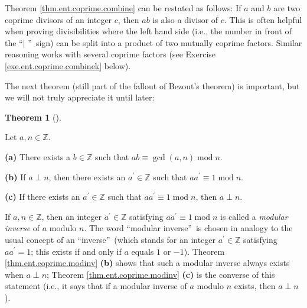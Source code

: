 \documentclass[numbers=enddot,12pt,final,onecolumn,notitlepage]{scrartcl}%
\numberwithin{exer}{subsection}
\theoremstyle{definition}
\newtheorem{theo}{Theorem}[subsection]
\newenvironment{theorem}[1][]
{\begin{theo}[#1]\begin{leftbar}}
{\end{leftbar}\end{theo}}
\begin{document}
Theorem \ref{thm.ent.coprime.combine} can be restated as follows: If $a$ and
$b$ are two coprime divisors of an integer $c$, then $ab$ is also a divisor of
$c$. This is often helpful when proving divisibilities where the left hand
side (i.e., the number in front of the \textquotedblleft$\mid$%
\textquotedblright\ sign) can be split into a product of two mutually coprime
factors. Similar reasoning works with several coprime factors (see Exercise
\ref{exe.ent.coprime.combinek} below).

The next theorem (still part of the fallout of Bezout's theorem) is important,
but we will not truly appreciate it until later:

\begin{theorem}
\label{thm.ent.coprime.modinv}Let $a,n\in\mathbb{Z}$.

\textbf{(a)} There exists a $b\in\mathbb{Z}$ such that $ab\equiv\gcd\left(
a,n\right)  \operatorname{mod}n$.

\textbf{(b)} If $a\perp n$, then there exists an $a^{\prime}\in\mathbb{Z}$
such that $aa^{\prime}\equiv1\operatorname{mod}n$.

\textbf{(c)} If there exists an $a^{\prime}\in\mathbb{Z}$ such that
$aa^{\prime}\equiv1\operatorname{mod}n$, then $a\perp n$.
\end{theorem}

If $a,n\in\mathbb{Z}$, then an integer $a^{\prime}\in\mathbb{Z}$ satisfying
$aa^{\prime}\equiv1\operatorname{mod}n$ is called a \textit{modular inverse}
of $a$ modulo $n$. The word \textquotedblleft modular
inverse\textquotedblright\ is chosen in analogy to the usual concept of an
\textquotedblleft inverse\textquotedblright\ (which stands for an integer
$a^{\prime}\in\mathbb{Z}$ satisfying $aa^{\prime}=1$; this exists if and only
if $a$ equals $1$ or $-1$). Theorem \ref{thm.ent.coprime.modinv} \textbf{(b)}
shows that such a modular inverse always exists when $a\perp n$; Theorem
\ref{thm.ent.coprime.modinv} \textbf{(c)} is the converse of this statement
(i.e., it says that if a modular inverse of $a$ modulo $n$ exists, then
$a\perp n$).
\end{document}
